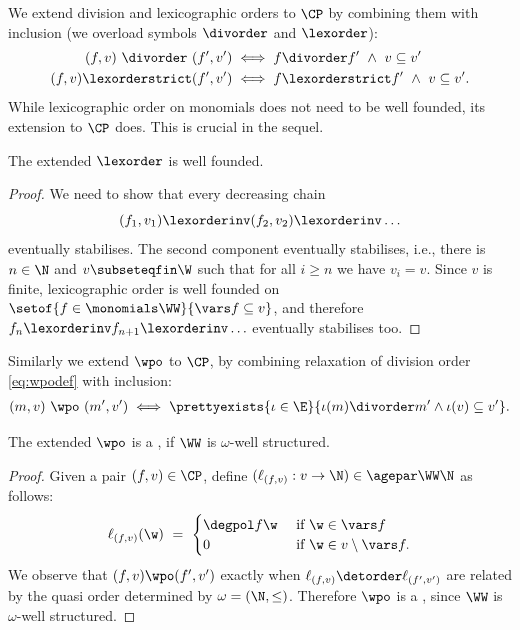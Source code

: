 We extend division and lexicographic orders to $\CP$
by combining them with inclusion (we overload symbols $\divorder$ and $\lexorder$):
\begin{align*}
(f, v) \ \divorder \ (f', v') & \iff f\divorder f' \ \wedge \ v \subseteq v' \\
(f, v)  \lexorderstrict (f', v') & \iff f\lexorderstrict f' \ \wedge \ v \subseteq v'.
\end{align*}
%
While lexicographic order on monomials does not need to be well founded, its extension to $\CP$ does.
This  is crucial in the sequel.
% 
\begin{lemmarep} \label{lem:lexwf}
The extended $\lexorder$ is well founded.
\end{lemmarep}
%
\begin{proof}
We need to show that every decreasing chain 
\[
(f_1, v_1)  \lexorderinv (f_2, v_2) \lexorderinv \ldots
\]
eventually stabilises.
The second component eventually
stabilises, i.e., there is $n\in\N$ and $v\subseteqfin \W$ such that for all $i\geq n$ we have
$v_i = v$.
Since $v$ is finite, lexicographic order is well founded on 
$\setof{f \in \monomials \WW}{\vars f \subseteq v}$, and
therefore $f_n \lexorderinv f_{n+1} \lexorderinv \ldots$ eventually stabilises too.
\end{proof}

Similarly we extend $\wpo$ to $\CP$, by combining relaxation of division order \eqref{eq:wpodef}
with inclusion:
%
\begin{align} \label{eq:wpodef2}
(m, v) \ \wpo \ (m', v')  \iff 
\prettyexists{\iota \in \E}{\iota(m) \divorder m' \wedge \iota(v) \subseteq v'}.
\end{align}

\begin{lemma} \label{lem:extwqo}
The extended $\wpo$ is a \wqo, if $\WW$ is $\omega$-well structured.
\end{lemma}
%
\begin{proof}
Given a pair $(f, v) \in \CP$, define
 $(\ell_{(f,v)} : v\to\N) \in \agepar \WW \N$ as follows:
\[
\ell_{(f,v)}(\w) \ = \ \begin{cases}
\degpol f \w & \text{ if } \w \in \vars f \\
0 & \text{ if } \w \in v\setminus \vars f.
\end{cases}
\]
We observe that $(f, v) \wpo (f', v')$ exactly when 
$\ell_{(f,v)} \detorder \ell_{(f', v')}$ are related by the quasi order determined by $\omega = (\N, \leq)$.
Therefore $\wpo$ is a \wqo, since $\WW$ is $\omega$-well structured.
\end{proof}


